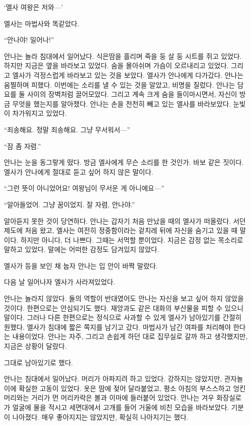 `엘사 여왕은 저와—'

엘사는 마법사와 똑같았다.

``안나야! 일어나!''

안나는 놀라 침대에서 일어났다. 식은땀을 흘리며 죽을 둥 살 둥 시트를 쥐고 있었다. 하지만 지금은 옆을 바라보고 있었다. 숨을 몰아쉬며 가슴이 오르내리고 있었다. 그리고 엘사가 걱정스럽게 바라보고 있는 것을 보았다. 엘사가 안나에게 다가갔다. 안나는 움찔하며 피했다. 이번에는 소리를 낼 수 있는 것을 알았고, 비명을 질렀다. 안나는 담요를 둘 사이의 장벽처럼 끌어모았다. 그리고 계속 크게 숨을 들이마시면서, 자신이 방금 무엇을 했는지를 알아챘다. 안나는 손을 천천히 빼고 있는 엘사를 바라보았다. 눈빛이 차가워지고 있었다.

``죄송해요. 정말 죄송해요. 그냥 무서워서—''

``잠 좀 자렴.''

안나는 눈을 동그랗게 떴다. 방금 엘사에게 무슨 소리를 한 것인가. 바보 같은 짓이다. 엘사가 안나에게 절대로 듣고 싶어 하지 않은 말이다.

``그런 뜻이 아니었어요! 여왕님이 무서운 게 아니에요—''

``알아들었어. 그냥 꿈이었지. 잘 자렴, 안나야.''

알아듣지 못한 것이 당연하다. 안나는 갑자기 처음 만났을 때의 엘사가 떠올랐다. 서던 제도에 처음 왔고, 엘사는 여전히 정중함이라는 겉치레 뒤에 자신을 숨기고 있을 때 말이다. 하지만 아니다, 더 나쁘다. 그때는 서먹할 뿐이었다. 지금은 감정 없는 목소리로 말하고 있었다. 말에는 어떠한 감정도 담겨있지 않았다.

엘사가 등을 보인 채 눕자 안나는 입 안이 바짝 말랐다.

\textbreak

다음 날 일어나자 엘사가 사라져있었다.

안나는 놀라지 않았다. 둘의 역할이 반대였어도 안나는 자신을 보고 싶어 하지 않았을 것이다. 한편으로는 안심되기도 했다. 재앙과도 같은 대화의 부산물을 피할 수 있으니 말이다. 그러나 다른 한편으로는 정식으로 사과할 수 있게 엘사가 남아있기를 간절히 원했다. 엘사가 침대에 짧은 쪽지를 남기고 갔다. 마법사가 남긴 여파를 처리해야 한다는 내용이었다. 안나는 자주, 그리고 손쉽게 하던 대로 집무실로 갈까 하고 생각했지만, 지금은 상황이 달랐다.

그대로 남아있기로 했다.

안나는 침대에서 일어났다. 머리가 아파지려 하고 있었다. 강하지는 않았지만, 관자놀이에 확실한 고동이 있었다. 옷은 땀에 젖어 달라붙었고, 평소 아침의 부스스하고 엉킨 머리와는 거리가 먼 머리카락은 볼과 이마에 들러붙어 있었다. 안나는 겨우 화장실로 가 얼굴에 물을 적시고 세면대에서 고개를 들어 거울에 비친 모습을 바라보았다. 기분이 나아졌다. 매우 좋아지지는 않았지만, 확실히 나아지기는 했다.

